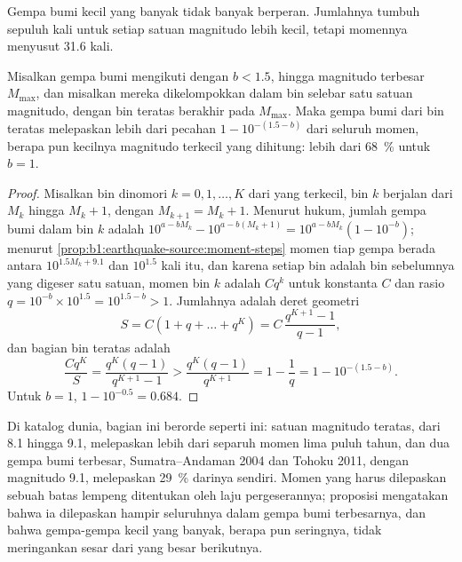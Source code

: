 Gempa bumi kecil yang banyak tidak banyak berperan. Jumlahnya tumbuh sepuluh kali untuk setiap satuan magnitudo lebih kecil, tetapi momennya menyusut 31.6 kali.

\begin{proposition}\label{prop:b1:earthquake-source:largest}
Misalkan gempa bumi mengikuti  dengan $b < 1.5$, hingga magnitudo terbesar $M_{\max}$, dan misalkan mereka dikelompokkan dalam bin selebar satu satuan magnitudo, dengan bin teratas berakhir pada $M_{\max}$. Maka gempa bumi dari bin teratas melepaskan lebih dari pecahan $1 - 10^{-(1.5 - b)}$ dari seluruh momen, berapa pun kecilnya magnitudo terkecil yang dihitung: lebih dari \qty{68}{\percent} untuk $b = 1$.
\end{proposition}

\begin{proof}
Misalkan bin dinomori $k = 0, 1, \dots, K$ dari yang terkecil, bin $k$ berjalan dari $M_k$ hingga $M_k + 1$, dengan $M_{k+1} = M_k + 1$. Menurut hukum, jumlah gempa bumi dalam bin $k$ adalah $10^{a - bM_k} - 10^{a - b(M_k+1)} =
10^{a - bM_k}(1 - 10^{-b})$; menurut \cref{prop:b1:earthquake-source:moment-steps} momen tiap gempa berada antara $10^{1.5M_k + 9.1}$ dan $10^{1.5}$ kali itu, dan karena setiap bin adalah bin sebelumnya yang digeser satu satuan, momen bin $k$ adalah $C q^k$ untuk konstanta $C$ dan rasio $q = 10^{-b}\times10^{1.5} = 10^{1.5 - b} > 1$. Jumlahnya adalah deret geometri
\[
  S = C(1 + q + \dots + q^K) = C\,\frac{q^{K+1} - 1}{q - 1} ,
\]
dan bagian bin teratas adalah
\[
  \frac{C q^K}{S} = \frac{q^K (q - 1)}{q^{K+1} - 1}
  > \frac{q^K (q - 1)}{q^{K+1}} = 1 - \frac1q = 1 - 10^{-(1.5 - b)} .
\]
Untuk $b = 1$, $1 - 10^{-0.5} = 0.684$.
\end{proof}

Di katalog dunia, bagian ini berorde seperti ini: satuan magnitudo teratas, dari 8.1 hingga 9.1, melepaskan lebih dari separuh momen lima puluh tahun, dan dua gempa bumi terbesar, Sumatra--Andaman 2004 dan Tohoku 2011, dengan magnitudo 9.1, melepaskan \qty{29}{\percent} darinya sendiri. Momen yang harus dilepaskan sebuah batas lempeng ditentukan oleh laju pergeserannya; proposisi mengatakan bahwa ia dilepaskan hampir seluruhnya dalam gempa bumi terbesarnya, dan bahwa gempa-gempa kecil yang banyak, berapa pun seringnya, tidak meringankan sesar dari yang besar berikutnya.


